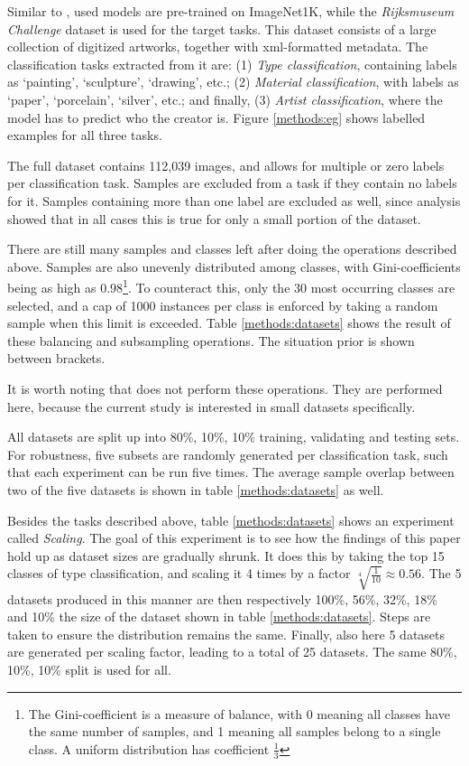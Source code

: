 Similar to \citeauthor{sabatelli2018deep}, used models are pre-trained on ImageNet1K, while the \textit{Rijksmuseum Challenge} dataset \citep{mensink14icmr} is used for the target tasks. This dataset consists of a large collection of digitized artworks, together with xml-formatted metadata. The classification tasks extracted from it are: (1) \textit{Type classification}, containing labels as `painting', `sculpture', `drawing', etc.; (2) \textit{Material classification}, with labels as `paper', `porcelain', `silver', etc.; and finally, (3) \textit{Artist classification}, where the model has to predict who the creator is. Figure \ref{methods:eg} shows labelled examples for all three tasks.

The full dataset contains 112,039 images, and allows for multiple or zero labels per classification task. Samples are excluded from a task if they contain no labels for it. Samples containing more than one label are excluded as well, since analysis showed that in all cases this is true for only a small portion of the dataset.%

There are still many samples and classes left after doing the operations described above. Samples are also unevenly distributed among classes, with Gini-coefficients being as high as 0.98\footnote{The Gini-coefficient is a measure of balance, with 0 meaning all classes have the same number of samples, and 1 meaning all samples belong to a single class. A uniform distribution has coefficient $\frac{1}{3}$}. To counteract this, only the 30 most occurring classes are selected, and a cap of 1000 instances per class is enforced by taking a random sample when this limit is exceeded. Table \ref{methods:datasets} shows the result of these balancing and subsampling operations. The situation prior is shown between brackets.

It is worth noting that \citeauthor{sabatelli2018deep} does not perform these operations. They are performed here, because the current study is interested in small datasets specifically.

All datasets are split up into 80\%, 10\%, 10\% training, validating and testing sets. For robustness, five subsets are randomly generated per classification task, such that each experiment can be run five times. The average sample overlap between two of the five datasets is shown in table \ref{methods:datasets} as well.

Besides the tasks described above, table \ref{methods:datasets} shows an experiment called \textit{Scaling}. The goal of this experiment is to see how the findings of this paper hold up as dataset sizes are gradually shrunk. It does this by taking the top 15 classes of type classification, and scaling it 4 times by a factor $\sqrt[4]{\frac{1}{10}} \approx 0.56$. The 5 datasets produced in this manner are then respectively 100\%, 56\%, 32\%, 18\% and 10\% the size of the dataset shown in table \ref{methods:datasets}. Steps are taken to ensure the distribution remains the same. Finally, also here 5 datasets are generated per scaling factor, leading to a total of 25 datasets. The same 80\%, 10\%, 10\% split is used for all.

